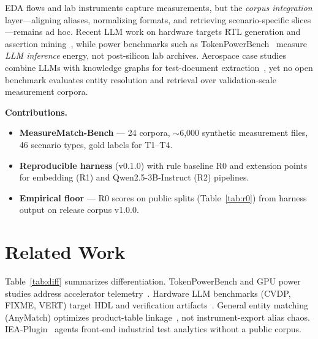 \documentclass[conference]{IEEEtran}
\begin{document}
EDA flows and lab instruments capture measurements, but the \emph{corpus integration} layer---aligning aliases, normalizing formats, and retrieving scenario-specific slices---remains ad hoc.
Recent LLM work on hardware targets RTL generation and assertion mining~\cite{cvdp2025,vert2025,fixme2026}, while power benchmarks such as TokenPowerBench~\cite{tokenpowerbench2025} measure \emph{LLM inference} energy, not post-silicon lab archives.
Aerospace case studies combine LLMs with knowledge graphs for test-document extraction~\cite{desantis2024llmkg}, yet no open benchmark evaluates entity resolution and retrieval over validation-scale measurement corpora.

\textbf{Contributions.}
\begin{itemize}
  \item \textbf{MeasureMatch-Bench} --- 24 corpora, $\sim$6{,}000 synthetic measurement files, 46 scenario types, gold labels for T1--T4.
  \item \textbf{Reproducible harness} (v0.1.0) with rule baseline R0 and extension points for embedding (R1) and Qwen2.5-3B-Instruct (R2) pipelines.
  \item \textbf{Empirical floor} --- R0 scores on public splits (Table~\ref{tab:r0}) from harness output on release corpus v1.0.0.
\end{itemize}

\section{Related Work}
Table~\ref{tab:diff} summarizes differentiation. TokenPowerBench and GPU power studies address accelerator telemetry~\cite{tokenpowerbench2025,caraml2024}.
Hardware LLM benchmarks (CVDP, FIXME, VERT) target HDL and verification artifacts~\cite{cvdp2025,fixme2026,vert2025}.
General entity matching (AnyMatch) optimizes product-table linkage~\cite{anymatch2024}, not instrument-export alias chaos.
IEA-Plugin~\cite{ieaplugin2025} agents front-end industrial test analytics without a public corpus.
\end{document}
